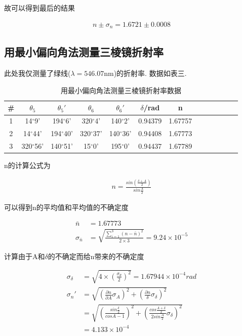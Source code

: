 \documentclass[a4paper,12pt,notitlepage]{article}
\begin{document}
	故可以得到最后的结果
	
\begin{align*}
	n \pm \sigma_n = 1.6721 \pm 0.0008
\end{align*}

\subsection{用最小偏向角法测量三棱镜折射率}

	此处我仅测量了绿线($\lambda = 546.07$nm)的折射率. 数据如表三.
	
\begin{center}
	\begin{longtable}{|c|c|c|c|c|c|c|c|c|c|c|c|c|}

	\caption{用最小偏向角法测量三棱镜折射率数据}	\\
	\hline
	\# & $\theta_5$ & $\theta_5'$ & $\theta_6$ & $\theta_6'$ & $\delta$/rad & n \\
	\hline
	1 & 14$^\circ$9' & 194$^\circ$6' & 320$^\circ$4' & 140$^\circ$2' & 0.94379 & 1.67757 \\
	\hline
	2 & 14$^\circ$44' & 194$^\circ$40' & 320$^\circ$37' & 140$^\circ$36' & 0.94408 & 1.67773 \\
	\hline
	3 & 320$^\circ$56' & 140$^\circ$51' & 15$^\circ$0' & 195$^\circ$0' & 0.94437 & 1.67789 \\
	\hline
	
	\end{longtable}
\end{center}

	n的计算公式为
	
\begin{align*}
	n = \frac{sin(\frac{\delta + A}{2})}{sin\frac{A}{2}}
\end{align*}

	可以得到n的平均值和平均值的不确定度
	
\begin{align*}
	\bar{n} &= 1.67773 \\
	\sigma_{\bar{n}} &= \sqrt{\frac{\sum_{i = 1}^3(n - \bar{n})^2}{2 \times 3}} = 9.24 \times 10^{-5}
\end{align*}

	计算由于A和$\delta$的不确定而给n带来的不确定度
	
\begin{align*}
	\sigma_\delta &= \sqrt{4 \times (\frac{\sigma_{\theta}}{2})^2} = 1.67944 \times 10^{-4} rad \\
	\sigma_n' &= \sqrt{(\frac{\partial n }{\partial A}\sigma_A)^2 + (\frac{\partial n }{\delta}\sigma_{\delta})^2} \\
	&= \sqrt{(\frac{sin\frac{\delta}{2}}{cosA - 1})^2 + (\frac{cos\frac{A + \delta}{2}}{2sin\frac{A}{2}}\sigma_\delta)^2} \\
	&= 4.133 \times 10^{-4}
\end{align*}
\end{document}
